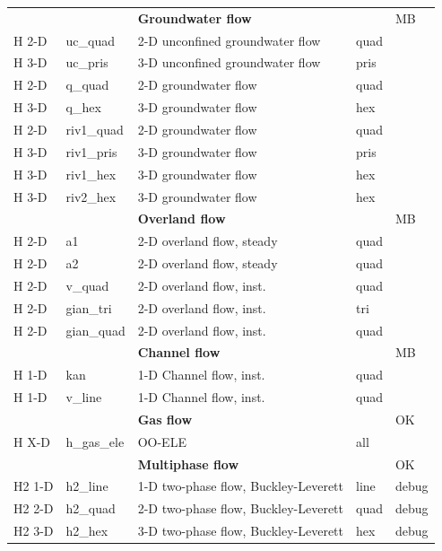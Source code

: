 \begin{center}
\begin{tabular*}{12.7cm}{|p{1.5cm}|p{1.8cm}|p{4.78cm}|p{1cm}|p{1.5cm}|}
\hline
           &             & \textbf{Groundwater flow} & & MB \\
H 2-D     & uc\_quad & 2-D unconfined groundwater flow & quad &  \\
H 3-D     & uc\_pris & 3-D unconfined groundwater flow & pris &  \\
H 2-D     & q\_quad & 2-D groundwater flow & quad &  \\
H 3-D     & q\_hex & 3-D groundwater flow & hex &  \\
H 2-D     & riv1\_quad & 2-D groundwater flow & quad & \\
H 3-D     & riv1\_pris & 3-D groundwater flow & pris & \\
H 3-D     & riv1\_hex & 3-D groundwater flow & hex & \\
H 3-D     & riv2\_hex & 3-D groundwater flow & hex & \\
\hline
           &             & \textbf{Overland flow} & & MB \\
H 2-D     & a1 & 2-D overland flow, steady & quad &  \\
H 2-D     & a2 & 2-D overland flow, steady & quad &  \\
H 2-D     & v\_quad & 2-D overland flow, inst. & quad & \\
H 2-D     & gian\_tri & 2-D overland flow, inst. & tri & \\
H 2-D     & gian\_quad & 2-D overland flow, inst. & quad & \\
\hline
           &             & \textbf{Channel flow} & & MB \\
H 1-D     & kan & 1-D Channel flow, inst. & quad & \\
H 1-D     & v\_line & 1-D Channel flow, inst. & quad & \\
\hline
           &             & \textbf{Gas flow} & & OK \\
H X-D     & h\_gas\_ele   & OO-ELE & all &  \\
\hline
           &             & \textbf{Multiphase flow} & & OK \\
H2 1-D     & h2\_line & 1-D two-phase flow, Buckley-Leverett & line & debug \\
H2 2-D     & h2\_quad & 2-D two-phase flow, Buckley-Leverett & quad & debug \\
H2 3-D     & h2\_hex  & 3-D two-phase flow, Buckley-Leverett & hex  & debug  \\
\hline
\end{tabular*}
\end{center}

